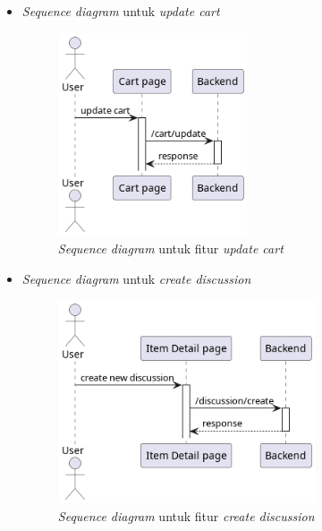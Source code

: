 \documentclass[a4paper]{article}
\begin{document}
\begin{enumerate}
\begin{enumerate}
\begin{itemize}
            \newpage
            \item \textit{Sequence diagram} untuk \textit{update cart}
            \begin{figure}[h]
                \centering
                \includegraphics*[height=6cm]{diagram/sequence diagram/FE/13. cart/update cart/template.png}
                \caption{\textit{Sequence diagram} untuk fitur \textit{update cart}}
            \end{figure}

            \item \textit{Sequence diagram} untuk \textit{create discussion}
            \begin{figure}[h]
                \centering
                \includegraphics*[height=6cm]{diagram/sequence diagram/FE/14. discussion/create discussion/create discussion.png}
                \caption{\textit{Sequence diagram} untuk fitur \textit{create discussion}}
            \end{figure}


\end{itemize}
\end{enumerate}
\end{enumerate}
\end{document}
